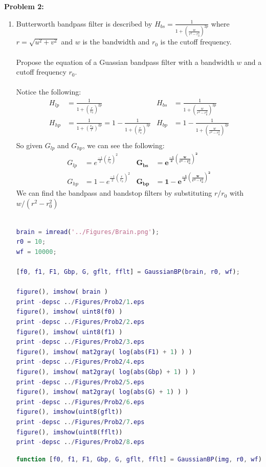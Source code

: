 \documentclass[11pt]{article}
\newenvironment{problem}[1]{\textbf{Problem #1: }}{\newpage}
\begin{document}
	\begin{problem}{2}
		\begin{enumerate}[label = (\alph*)]
			\item Butterworth bandpass filter is described by $H_{bs} = \frac{1}{1+\left(\frac{w}{r^2 - r_0^2}\right)^{2p}}$ where $r = \sqrt{u^2 + v^2}$ and $w$ is the bandwidth and $r_0$ is the cutoff frequency. 
			\\ \\
			Propose the equation of a Guassian bandpass filter with a bandwidth $w$ and a cutoff frequency $r_0$.
			\\ \\
			Notice the following:
			\begin{align*}
				H_{lp} &= \frac{1}{1+\left(\frac{r}{r_0}\right)^{2p}}  & H_{bs} &= \frac{1}{1+\left(\frac{w}{r^2 - r_0^2}\right)^{2p}}  \\
				H_{hp} &= \frac{1}{1+\left(\frac{r_0}{r}\right)^{2p}} = 1 - \frac{1}{1+\left(\frac{r}{r_0}\right)^{2p}} &H_{bp} &= 1 - \frac{1}{1+\left(\frac{w}{r^2 - r_0^2}\right)^{2p}}  \\		
			\end{align*}
			So given $G_{lp}$ and $G_{hp}$, we can see the following:
			\begin{align*}
				G_{lp} &= e^{\frac{-1}{2}\left(\frac{r}{r_0}\right)^2} & \boldsymbol{G_{bs}} &= \boldsymbol{e^{\frac{-1}{2}\left(\frac{w}{r^2 - r_0^2}\right)^2}} \\
				G_{hp} &= 1 - e^{\frac{-1}{2}\left(\frac{r}{r_0}\right)^2} & \boldsymbol{G_{bp}} &= \boldsymbol{1 - e^{\frac{-1}{2}\left(\frac{w}{r^2 - r_0^2}\right)^2}}
			\end{align*}
			We can find the bandpass and bandstop filters by substituting $r / r_0$ with $w / (r^2 - r_0^2)$ 
			\\ \\
\begin{lstlisting}[language=Matlab]
brain = imread('../Figures/Brain.png');
r0 = 10;
wf = 10000;

[f0, f1, F1, Gbp, G, gflt, fflt] = GaussianBP(brain, r0, wf);

figure(), imshow( brain )
print -depsc ../Figures/Prob2/1.eps
figure(), imshow( uint8(f0) )
print -depsc ../Figures/Prob2/2.eps
figure(), imshow( uint8(f1) )
print -depsc ../Figures/Prob2/3.eps
figure(), imshow( mat2gray( log(abs(F1) + 1) ) )
print -depsc ../Figures/Prob2/4.eps
figure(), imshow( mat2gray( log(abs(Gbp) + 1) ) )
print -depsc ../Figures/Prob2/5.eps
figure(), imshow( mat2gray( log(abs(G) + 1) ) )
print -depsc ../Figures/Prob2/6.eps
figure(), imshow(uint8(gflt))
print -depsc ../Figures/Prob2/7.eps
figure(), imshow(uint8(fflt))
print -depsc ../Figures/Prob2/8.eps
\end{lstlisting}
			\newpage
\begin{lstlisting}[language=Matlab]
function [f0, f1, F1, Gbp, G, gflt, fflt] = GaussianBP(img, r0, wf)


\end{lstlisting}
\end{enumerate}
\end{problem}
\end{document}
